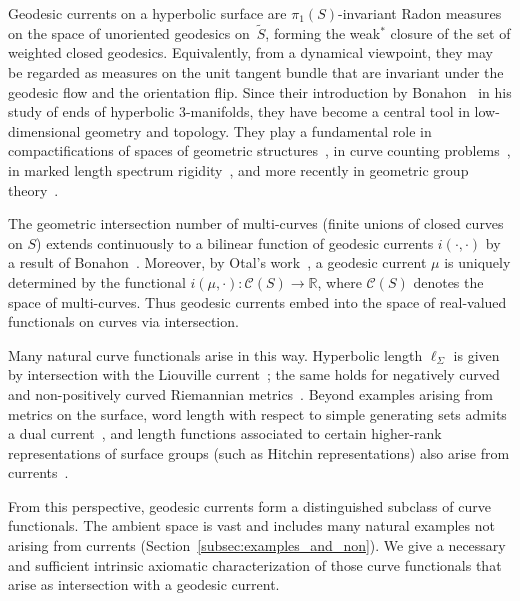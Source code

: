 \documentclass[11pt]{amsart}
\numberwithin{equation}{section}
\numberwithin{figure}{section}
\theoremstyle{definition}
\theoremstyle{plain}
\newcommand*{\wt}[1]{\widetilde{#1}}
\begin{document}
Geodesic currents on a hyperbolic surface are $\pi_1(S)$-invariant
Radon measures on the
space of unoriented geodesics on~$\wt{S}$, forming the weak$^*$
closure of the set
of weighted closed geodesics. Equivalently, from a dynamical
viewpoint, they may be regarded as measures on the unit tangent bundle
that are invariant under the geodesic flow and the orientation flip.
Since their introduction by Bonahon~\cite{Bonahon86:EndsHyperbolicManifolds}
in his study of ends of hyperbolic $3$-manifolds, they have become a
central tool in low-dimensional geometry and topology. They play a
fundamental role in compactifications of spaces of geometric
structures~\cite{Bonahon88:GeodesicCurrent, DLR10:DegenerationFlatMetrics,
MZ19:PositivelyRatioed,BIPP24:PositiveCrossratios}, in curve counting
problems~\cite{RS19:CountingProblems, EPS20:CountingCurves,
ES22:GeodesicCount}, in marked length spectrum
rigidity~\cite{Otal90:SpectreMarqueNegative, CFF92:RigidityNonPosCurvedRiem,
HP97:RigidityNegCurvedCone, Con18:MarkedNonpos}, and more recently in
geometric group theory~\cite{HV24:Biautomaticity, CR25:Manhattan, CMGR26:GreenMetrics}.

The geometric intersection number of multi-curves (finite unions of closed curves on $S$) extends continuously to a bilinear function of geodesic currents $i(\cdot, \cdot)$ by a result of Bonahon~\cite[Proposition~4.5]{Bonahon86:EndsHyperbolicManifolds}. Moreover, by Otal's work~\cite[Th\'eor\`eme~2]{Otal90:SpectreMarqueNegative}, a geodesic current $\mu$ is uniquely determined by the functional $i(\mu,\cdot) \colon \mathcal{C}(S) \to \mathbb{R}$, where $\mathcal C(S)$ denotes the space of multi-curves. Thus geodesic currents embed into the space of real-valued functionals on curves via intersection.  

Many natural curve functionals arise in this way. Hyperbolic length
$\ell_\Sigma$ is given by intersection with the Liouville
current~\cite[Theorem~10]{Bonahon88:GeodesicCurrent}; the same holds
for negatively curved~\cite{Otal90:SpectreMarqueNegative}
and non-positively
curved Riemannian metrics~\cite{CFF92:RigidityNonPosCurvedRiem}.
Beyond examples arising from metrics on the
surface, word length with respect to simple generating sets admits a
dual current~\cite[Theorem~1.2]{Erlandsson:WordLength}, and length
functions associated to certain higher-rank representations of surface
groups (such as Hitchin representations) also arise from
currents~\cite{MZ19:PositivelyRatioed,BIPP24:PositiveCrossratios}.

From this perspective, geodesic currents form a distinguished subclass of curve functionals. The ambient space is vast and includes many natural examples not arising from currents (Section~\ref{subsec:examples_and_non}). We give a necessary and sufficient intrinsic axiomatic characterization of those curve functionals that arise as intersection with a geodesic current.
\end{document}

